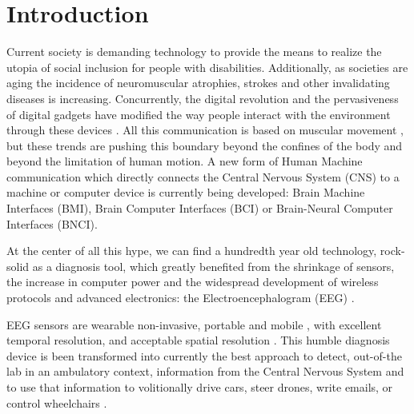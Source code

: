 \documentclass[brainsci,article,submit,moreauthors,pdftex,10pt,a4paper]{mdpi}
\begin{document}

\setcounter{section}{-1} %

\section{Introduction}






Current society is demanding technology to provide the means to realize the utopia of social inclusion for people with disabilities\citep{Wolpaw2002}.  Additionally, as societies are aging \citep{Lutz2008} the incidence of neuromuscular atrophies, strokes and other invalidating diseases is increasing.  Concurrently, the digital revolution and the pervasiveness of digital gadgets have modified the way people interact with the environment through these devices \citep{Domingo2012}.  All this communication is based on muscular movement \citep{Guger2017}, but these trends are pushing this boundary beyond the confines of the body and beyond the limitation of human motion.  A new form of Human Machine communication which directly connects the Central Nervous System (CNS) to a machine or computer device is currently being developed: Brain Machine Interfaces (BMI), Brain Computer Interfaces (BCI) or Brain-Neural Computer Interfaces (BNCI).

At the center of all this hype, we can find a hundredth year old technology, rock-solid as a diagnosis tool, which greatly benefited from the shrinkage of sensors, the increase in computer power and the widespread development of wireless protocols and advanced electronics: the Electroencephalogram (EEG) \citep{Schomer2010}.

EEG sensors are wearable \citep{Puce2017} non-invasive, portable and mobile \citep{DeVos2014}, with excellent temporal resolution, and acceptable spatial resolution \citep{Hartman2005}.  This humble diagnosis device is been transformed into currently the best approach to detect, out-of-the lab in an ambulatory context, information from the Central Nervous System and to use that information to volitionally drive cars, steer drones, write emails, or control wheelchairs \citep{Yuste2017}.
\end{document}
